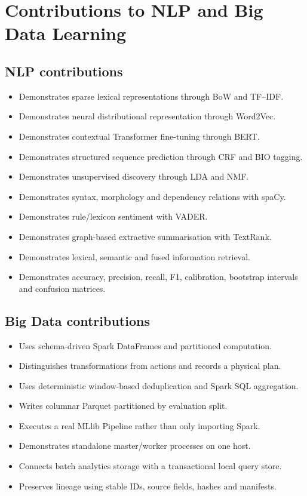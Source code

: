 \documentclass[12pt,a4paper]{report}
\begin{document}
\chapter{Contributions to NLP and Big Data Learning}

\section{NLP contributions}

\begin{itemize}
  \item Demonstrates sparse lexical representations through BoW and TF--IDF.
  \item Demonstrates neural distributional representation through Word2Vec.
  \item Demonstrates contextual Transformer fine-tuning through BERT.
  \item Demonstrates structured sequence prediction through CRF and BIO tagging.
  \item Demonstrates unsupervised discovery through LDA and NMF.
  \item Demonstrates syntax, morphology and dependency relations with spaCy.
  \item Demonstrates rule/lexicon sentiment with VADER.
  \item Demonstrates graph-based extractive summarisation with TextRank.
  \item Demonstrates lexical, semantic and fused information retrieval.
  \item Demonstrates accuracy, precision, recall, F1, calibration, bootstrap intervals and confusion matrices.
\end{itemize}

\section{Big Data contributions}

\begin{itemize}
  \item Uses schema-driven Spark DataFrames and partitioned computation.
  \item Distinguishes transformations from actions and records a physical plan.
  \item Uses deterministic window-based deduplication and Spark SQL aggregation.
  \item Writes columnar Parquet partitioned by evaluation split.
  \item Executes a real MLlib Pipeline rather than only importing Spark.
  \item Demonstrates standalone master/worker processes on one host.
  \item Connects batch analytics storage with a transactional local query store.
  \item Preserves lineage using stable IDs, source fields, hashes and manifests.
\end{itemize}
\end{document}
